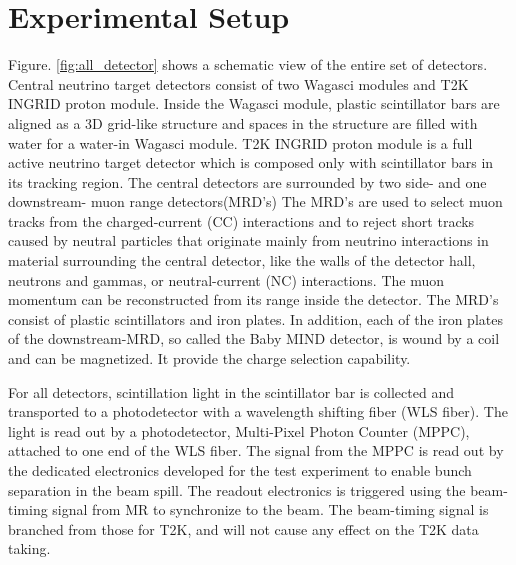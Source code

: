 \section{Experimental Setup}
Figure. \ref{fig:all_detector} shows a schematic view of the entire set of detectors.
Central neutrino target detectors consist of two Wagasci modules and T2K INGRID proton module. 
Inside the Wagasci module, plastic scintillator bars are aligned as a 3D grid-like structure
and spaces in the structure are filled with water for a water-in Wagasci module.
T2K INGRID proton module is a full active neutrino target detector which is composed only with scintillator bars in its tracking region. 
The central detectors are surrounded by two side- and one downstream- muon range detectors(MRD's)
The MRD's are used to select muon tracks from the charged-current (CC) interactions 
and to reject short tracks caused by neutral particles 
that originate mainly from neutrino interactions in material surrounding the central detector, like the walls of the detector hall,
neutrons and gammas, or neutral-current (NC) interactions.
The muon momentum can be reconstructed from its range inside the detector.
The MRD's consist of plastic scintillators and iron plates.
In addition, each of the iron plates of the downstream-MRD, so called the Baby MIND detector, is wound by a coil and
can be magnetized. It provide the charge selection capability.


For all detectors, scintillation light in the scintillator bar is collected and transported to a photodetector with a wavelength shifting fiber (WLS fiber).
The light is read out by a photodetector, Multi-Pixel Photon Counter (MPPC), attached to one end of the WLS fiber.
The signal from the MPPC is read out by the dedicated electronics developed for the test experiment
to enable bunch separation in the beam spill.
The readout electronics is triggered using the beam-timing signal from MR to synchronize to the beam.
The beam-timing signal is branched from those for T2K, and will not cause any effect on the T2K data taking.

